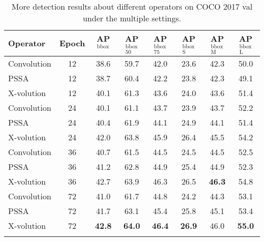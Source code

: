 \documentclass{article}
\newcommand{\cgap}[2]{
	\fontsize{6pt}{1em}\selectfont{(${#1}${#2})}
}
\newcommand{\apbbox}[1]{AP$^\text{bbox}_\text{#1}$}
\begin{document}
\begin{table*}[!htb]\centering
 \caption{More detection results about different operators on COCO 2017 val under the multiple settings. 
}
 \label{tab:more det results}
 \begin{spacing}{1.05}
 \small
 \setlength\tabcolsep{5pt}
 \begin{threeparttable}
 \begin{tabular}{l|c|c|c|c|c|c|c}
        \Xhline{1.1pt}
        Operator
        & Epoch
		& \fontsize{8pt}{1em}\selectfont \quad\apbbox{~}
		& \fontsize{8pt}{1em}\selectfont \quad\apbbox{50}
		& \fontsize{8pt}{1em}\selectfont \quad\apbbox{75}
		& \fontsize{8pt}{1em}\selectfont \quad\apbbox{S}
		& \fontsize{8pt}{1em}\selectfont \quad\apbbox{M}
		& \fontsize{8pt}{1em}\selectfont \quad\apbbox{L} \\ \hline


		Convolution & 12 & 38.6 & 59.7 & 42.0 & 23.6 & 42.3 & 50.0 \\ 
		PSSA & 12 & 38.7\cgap{+}{0.1} & 60.4\cgap{+}{0.7} & 42.2\cgap{+}{0.2} & 23.8\cgap{+}{0.2} & 42.3\cgap{+}{0.0} & 49.1\cgap{-}{0.9} \\ 
	    X-volution & 12 & 40.1\cgap{+}{1.5} & 61.3\cgap{+}{1.6} & 43.6\cgap{+}{1.6} & 24.0\cgap{+}{0.4} & 43.6\cgap{+}{1.3} & 51.4\cgap{+}{1.4} \\
	
		\cline{1-8}
		
		Convolution & 24 & 40.1 & 61.1 & 43.7 & 23.9 & 43.7 & 52.2 \\ 
		PSSA & 24 & 40.4\cgap{+}{0.3} & 61.9\cgap{+}{0.8} & 44.1\cgap{+}{0.4} & 24.9\cgap{+}{1.0} & 44.1\cgap{+}{0.4} & 51.4\cgap{-}{0.8} \\ 
	    X-volution  & 24 & 42.0\cgap{+}{1.9}  & 63.8\cgap{+}{2.7} & 45.9\cgap{+}{2.2} & 26.4\cgap{+}{2.5} & 45.5\cgap{+}{1.8} & 54.2\cgap{+}{2.0} \\ 
	    \cline{1-8}
	    
		Convolution & 36 & 40.7 & 61.5 & 44.5 & 24.5 & 44.5 & 52.5 \\ 
		PSSA & 36 & 41.2\cgap{+}{0.5} & 62.8\cgap{+}{1.3} & 44.9\cgap{+}{0.4} & 25.4\cgap{+}{0.9} & 44.9\cgap{+}{0.4} & 52.3\cgap{-}{0.2} \\  
	    X-volution & 36 & 42.7\cgap{+}{2.0} & 63.9\cgap{+}{2.4} & 46.3\cgap{+}{1.8} & 26.5\cgap{+}{2.0} & \textbf{46.3}\cgap{+}{1.8} & 54.8\cgap{+}{2.3} \\
	    \cline{1-8}
	    
		Convolution & 72 & 41.0   & 61.7 & 44.8 & 24.2 & 44.3 & 53.1 \\ 
		PSSA & 72 & 41.7\cgap{+}{0.7} & 63.1\cgap{+}{1.4} & 45.4\cgap{+}{0.6} & 25.8\cgap{+}{1.6} & 45.1\cgap{+}{0.8} & 53.4\cgap{+}{0.3} \\ 
	    X-volution & 72 & \textbf{42.8}\cgap{+}{1.8} & \textbf{64.0}\cgap{+}{2.3} & \textbf{46.4}\cgap{+}{1.6} & \textbf{26.9}\cgap{+}{2.7} & 46.0\cgap{+}{1.7}   & \textbf{55.0}\cgap{+}{1.9}   \\
		\Xhline{1.0pt}
		
\end{tabular}
\end{threeparttable}
\end{spacing}
\end{table*}
\end{document}
